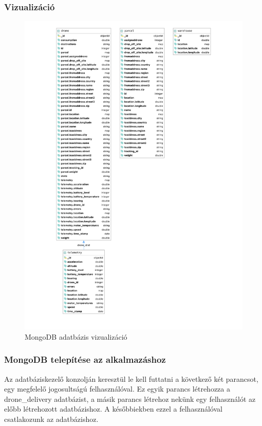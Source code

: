 \subsubsection{Vizualizáció}

\begin{figure}[hbt!]
    \centering
    \includegraphics[scale=0.7]{images/mongo.pdf}
    \caption{MongoDB adatbázis vizualizáció}
    \label{fig:mongodb}
\end{figure}

\subsubsection{MongoDB telepítése az alkalmazáshoz}\label{subsubsec:mongodb-telepítése-az-alkalmazáshoz}
Az adatbáziskezelő konzolján keresztül le kell futtatni a következő két parancsot, egy megfelelő jogosultságú felhasználóval.
Ez egyik parancs létrehozza a drone\_delivery adatbázist, a másik parancs létrehoz nekünk egy felhasználót az előbb létrehozott adatbázishoz.
A későbbiekben ezzel a felhasználóval csatlakozunk az adatbázishoz.

